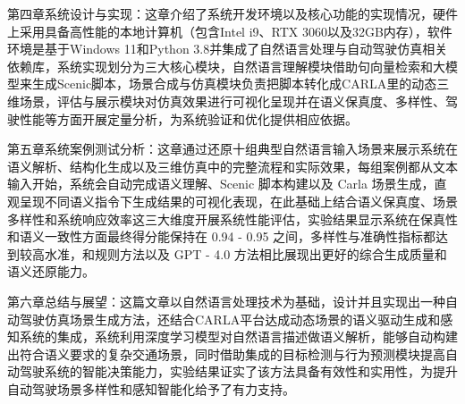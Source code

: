 第四章系统设计与实现：这章介绍了系统开发环境以及核心功能的实现情况，硬件上采用具备高性能的本地计算机（包含Intel i9、RTX 3060以及32GB内存），软件环境是基于Windows 11和Python 3.8并集成了自然语言处理与自动驾驶仿真相关依赖库，系统实现划分为三大核心模块，自然语言理解模块借助句向量检索和大模型来生成Scenic脚本，场景合成与仿真模块负责把脚本转化成CARLA里的动态三维场景，评估与展示模块对仿真效果进行可视化呈现并在语义保真度、多样性、驾驶性能等方面开展定量分析，为系统验证和优化提供相应依据。

第五章系统案例测试分析：这章通过还原十组典型自然语言输入场景来展示系统在语义解析、结构化生成以及三维仿真中的完整流程和实际效果，每组案例都从文本输入开始，系统会自动完成语义理解、Scenic 脚本构建以及 Carla 场景生成，直观呈现不同语义指令下生成结果的可视化表现，在此基础上结合语义保真度、场景多样性和系统响应效率这三大维度开展系统性能评估，实验结果显示系统在保真性和语义一致性方面最终得分能保持在 0.94 - 0.95 之间，多样性与准确性指标都达到较高水准，和规则方法以及 GPT - 4.0 方法相比展现出更好的综合生成质量和语义还原能力。

第六章总结与展望：这篇文章以自然语言处理技术为基础，设计并且实现出一种自动驾驶仿真场景生成方法，还结合CARLA平台达成动态场景的语义驱动生成和感知系统的集成，系统利用深度学习模型对自然语言描述做语义解析，能够自动构建出符合语义要求的复杂交通场景，同时借助集成的目标检测与行为预测模块提高自动驾驶系统的智能决策能力，实验结果证实了该方法具备有效性和实用性，为提升自动驾驶场景多样性和感知智能化给予了有力支持。